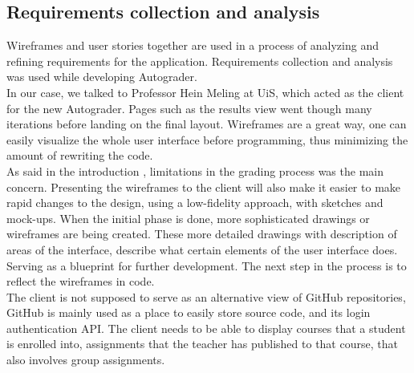 \subsection{Requirements collection and analysis}

Wireframes and user stories together are used in a process of analyzing and refining requirements for the application. Requirements collection and analysis was used while developing Autograder. 
\\In our case, we talked to Professor Hein Meling at UiS, which acted as the client for the new Autograder. Pages such as the results view  went though many iterations before landing on the final layout. Wireframes are a great way, one can easily visualize the whole user interface before programming, thus minimizing the amount of rewriting the code.
\\As said in the introduction , limitations in the grading process was the main concern. Presenting the wireframes to the client will also make it easier to make rapid changes to the design, using a low-fidelity approach, with sketches and mock-ups. When the initial phase is done, more sophisticated drawings or wireframes are being created. These more detailed drawings with description of areas of the interface, describe what certain elements of the user interface does. Serving as a blueprint for further development. The next step in the process is to reflect the wireframes in code.
\\The client is not supposed to serve as an alternative view of GitHub repositories, GitHub is mainly used as a place to easily store source code, and its login authentication API. The client needs to be able to display courses that a student is enrolled into, assignments that the teacher has published to that course, that also involves group assignments.

